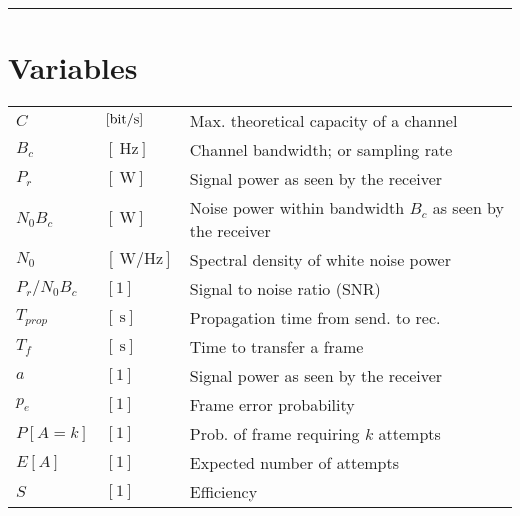 \documentclass{form}
\begin{document}
\noindent\rule{\textwidth}{0.4pt}\vspace{-1.5em}

\section*{Variables}

\begin{center}
    \noindent%
    \begin{minipage}{0.49\textwidth}
        \begin{tabular}{l l | p{59mm}}
            $C$           & $[\SI{}{\bit/\second}     ]$ & Max. theoretical capacity of a channel                      \\
            $B_c$         & $[\SI{}{\hertz}           ]$ & Channel bandwidth; or sampling rate                         \\
            $P_r$         & $[\SI{}{\watt}            ]$ & Signal power as seen by the receiver                        \\
            $N_0 B_c$     & $[\SI{}{\watt}            ]$ & Noise power within bandwidth $B_c$ as seen by the receiver  \\
            $N_0$         & $[\SI{}{\watt/\hertz}     ]$ & Spectral density of white noise power                       \\
            $P_r/N_0 B_c$ & $[1                       ]$ & Signal to noise ratio (SNR)                                 \\
            $T_{prop}$    & $[\SI{}{\second}          ]$ & Propagation time from send. to rec.                         \\
            $T_f$         & $[\SI{}{\second}          ]$ & Time to transfer a frame                                    \\
            $a$           & $[1                       ]$ & Signal power as seen by the receiver                        \\
            $p_e$         & $[1                       ]$ & Frame error probability                                     \\
            $P[A=k]$      & $[1                       ]$ & Prob. of frame requiring $k$ attempts                       \\
            $E[A]$        & $[1                       ]$ & Expected number of attempts                                 \\
            $S$           & $[1                       ]$ & Efficiency                                                  \\

\end{tabular}
\end{minipage}
\end{center}
\end{document}
